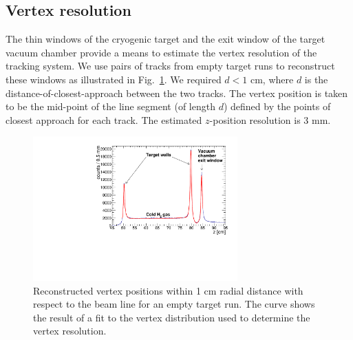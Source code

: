 \subsection{Vertex resolution}

The thin windows of the cryogenic target and the exit window of the target
vacuum chamber provide a means to estimate the 
vertex resolution of the tracking system.  We use pairs of tracks from 
empty target runs to reconstruct these windows as illustrated in 
Fig.~\ref{fig:z-vertex}.  We required $d<1$ cm, where $d$ is the 
distance-of-closest-approach between the two tracks. The vertex position 
is taken to be the mid-point of the line segment (of length $d$) defined by the points of closest approach for each track.
The estimated $z$-position resolution is 3 mm.

\begin{figure}[tbp]
\begin{center}
\includegraphics[width=0.7\textwidth]{figures/ZVertex.pdf}  
\caption{\label{fig:z-vertex} Reconstructed vertex positions within 1 cm radial
 distance with respect to the beam line for an empty target run.  The curve shows the result of a fit to the vertex distribution used to determine the vertex
resolution.
}   
\end{center}  
\end{figure}

